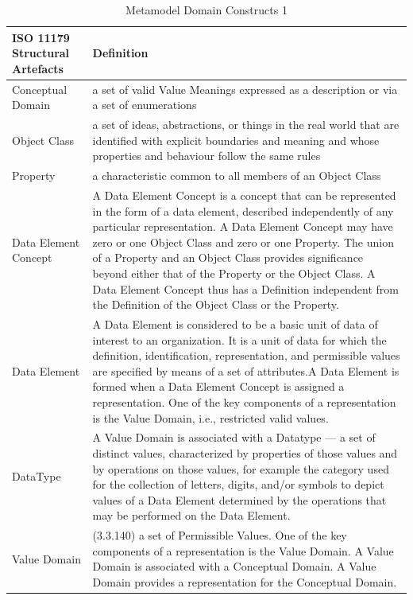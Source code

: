 \documentclass{article}
\begin{document}
\newpage 
\onecolumn	
			 \begin{table}[!htbp]
		\begin{center}
			\caption{Metamodel Domain Constructs 1}
			\label{tab:metamodelconstructs1}
			\begin{tabular}{ p{6cm} | p{8cm}  } 
				\textbf{ISO 11179 Structural Artefacts} & \textbf{Definition} \\
				\hline
				Conceptual Domain & a set of valid Value Meanings expressed as a description or via a set of enumerations   \\ 
				\hline
				Object Class &  a set of ideas, abstractions, or things in the real world that are identified with explicit boundaries and meaning and whose properties and behaviour follow the same rules     \\ 
				\hline
				Property &  a characteristic common to all members of an Object Class    \\ 
				\hline
				Data Element Concept &  A Data Element Concept is a concept that can be represented in the form of a data element, described independently of any particular representation. A Data Element Concept may have zero or one Object Class and zero or one Property. The union of a Property and an Object Class provides significance beyond either that of the Property or the Object Class. A Data Element Concept thus has a Definition independent from the Definition of the Object Class or the Property. \\
				\hline
				Data Element &   A Data Element is considered to be a basic unit of data of interest to an organization. It is a unit of data for which the definition, identification, representation, and permissible values are specified by means of a set of attributes.A Data Element is formed when a Data Element Concept is assigned a representation. One of the key components of a representation is the Value Domain, i.e., restricted valid values. \\
				\hline
				DataType & A Value Domain is associated with a Datatype — a set of distinct values, characterized by properties of those values and by operations on those values, for example the category used for the collection of letters, digits, and/or symbols to depict values of a Data Element determined by the operations that may be performed on the Data Element.
				 \\
				\hline
				Value Domain &  (3.3.140) a set of Permissible Values. One of the key components of a representation is the Value Domain. A Value Domain is associated with a Conceptual Domain. A Value Domain provides a representation for the Conceptual Domain. \\

\end{tabular}
\end{center}
\end{table}
\end{document}

